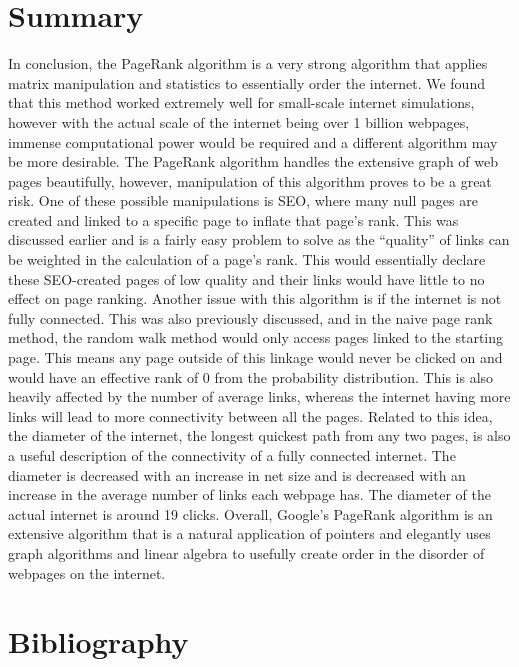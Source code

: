 \documentclass{article}
\begin{document}
\section{Summary}
\quad \quad \quad 
In conclusion, the PageRank algorithm is a very strong algorithm that applies matrix manipulation and statistics to essentially order the internet. We found that this method worked extremely well for small-scale internet simulations, however with the actual scale of the internet being over 1 billion webpages, immense computational power would be required and a different algorithm may be more desirable. The PageRank algorithm handles the extensive graph of web pages beautifully, however, manipulation of this algorithm proves to be a great risk. One of these possible manipulations is SEO, where many null pages are created and linked to a specific page to inflate that page’s rank. This was discussed earlier and is a fairly easy problem to solve as the “quality” of links can be weighted in the calculation of a page’s rank. This would essentially declare these SEO-created pages of low quality and their links would have little to no effect on page ranking. Another issue with this algorithm is if the internet is not fully connected. This was also previously discussed, and in the naive page rank method, the random walk method would only access pages linked to the starting page. This means any page outside of this linkage would never be clicked on and would have an effective rank of 0 from the probability distribution. This is also heavily affected by the number of average links, whereas the internet having more links will lead to more connectivity between all the pages. Related to this idea, the diameter of the internet, the longest quickest path from any two pages, is also a useful description of the connectivity of a fully connected internet. The diameter is decreased with an increase in net size and is decreased with an increase in the average number of links each webpage has. The diameter of the actual internet is around 19 clicks. Overall, Google’s PageRank algorithm is an extensive algorithm that is a natural application of pointers and elegantly uses graph algorithms and linear algebra to usefully create order in the disorder of webpages on the internet. 

\pagebreak
\section{Bibliography}
\end{document}
